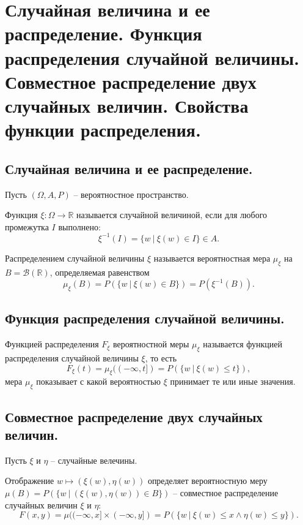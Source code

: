 \section{Случайная величина и ее распределение. Функция распределения случайной величины. Совместное распределение двух случайных величин. Свойства функции распределения.}

\subsection{Случайная величина и ее распределение.}
Пусть $(\Omega, A, P)$ -- вероятностное пространство.
\begin{definition}
    Функция $\xi : \Omega \to \mathbb{R}$ называется случайной величиной, если для любого промежутка $I$ выполнено:
    \[
        \xi^{-1}(I) = \{ w \> | \> \xi(w) \in I \} \in A.
    \]
\end{definition}
\begin{definition}
    Распределением случайной величины $\xi$ называется вероятностная мера $\mu_{\xi}$ на $B = \mathcal{B}(\mathbb{R})$, определяемая равенством
    \[
        \mu_{\xi} (B) = P(\{ w \> | \> \xi(w) \in B \}) = P(\xi^{-1}(B)).
    \]
\end{definition}

\subsection{Функция распределения случайной величины.}
\begin{definition}
    Функцией распределения $F_\xi$ вероятностной меры $\mu_\xi$ называется функцией распределения случайной величины $\xi$, то есть
    \[
        F_\xi(t) = \mu_\xi((-\infty, t]) = P(\{ w \> | \> \xi(w) \leqslant t \}),
    \]
    мера $\mu_\xi$ показывает с какой вероятностью $\xi$ принимает те или иные значения.
\end{definition}

\subsection{Совместное распределение двух случайных величин.}
Пусть $\xi$ и $\eta$ -- случайные велечины.
\begin{definition}
    Отображение  $w \mapsto (\xi(w), \eta(w))$ определяет вероятностную меру $\mu(B) = P(\{ w \> | \> (\xi(w), \eta(w)) \in B\})$ -- совместное распределение случайных величин $\xi$ и $\eta$:
    \[
        F(x,y) = \mu((-\infty, x] \times (-\infty, y]) = P(\{ w \> | \> \xi(w) \leqslant x \wedge \eta(w) \leqslant y \}).
    \]
\end{definition}

